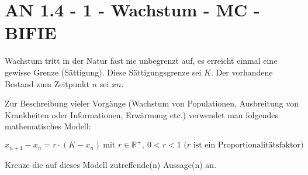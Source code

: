 \section{AN 1.4 - 1 - Wachstum - MC - BIFIE}


\begin{beispiel}[AN 1.4]{1} %
Wachstum tritt in der Natur fast nie unbegrenzt auf, es erreicht einmal eine gewisse Grenze (Sättigung). Diese Sättigungsgrenze sei $K$. Der vorhandene Bestand zum Zeitpunkt $n$ sei $xn$.

Zur Beschreibung vieler Vorgänge (Wachstum von Populationen, Ausbreitung von Krankheiten
oder Informationen, Erwärmung etc.) verwendet man folgendes mathematisches Modell:

\[x_{n+1} - x_n = r \cdot (K - x_n)~ \text {mit } r \in \mathbb{R}^+,~ 0 < r < 1 \text{ ($r$ ist ein Proportionalitätsfaktor)} \]

Kreuze die auf dieses Modell zutreffende(n) Aussage(n) an.

\end{beispiel}
